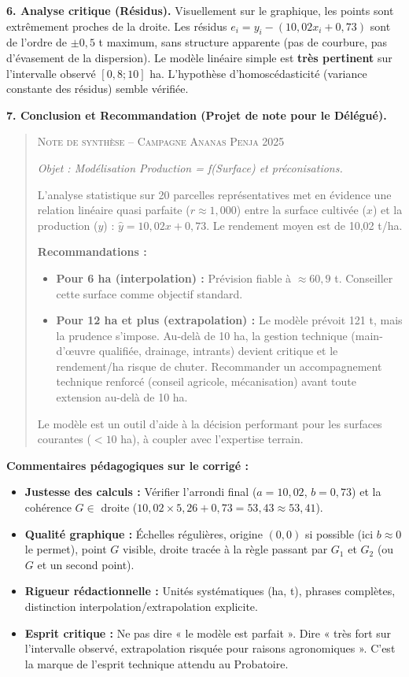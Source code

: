 \documentclass[11pt]{article}
\begin{document}
\begin{exoresolu}
\textbf{6. Analyse critique (Résidus).}
Visuellement sur le graphique, les points sont extrêmement proches de la droite. Les résidus $e_i = y_i - (10,02 x_i + 0,73)$ sont de l'ordre de $\pm 0,5$ t maximum, sans structure apparente (pas de courbure, pas d'évasement de la dispersion). Le modèle linéaire simple est \textbf{très pertinent} sur l'intervalle observé $[0,8; 10]$ ha. L'hypothèse d'homoscédasticité (variance constante des résidus) semble vérifiée.

\textbf{7. Conclusion et Recommandation (Projet de note pour le Délégué).}
\begin{quote}
\textsc{Note de synthèse -- Campagne Ananas Penja 2025}

\emph{Objet : Modélisation Production = f(Surface) et préconisations.}

L'analyse statistique sur 20 parcelles représentatives met en évidence une relation linéaire quasi parfaite ($r \approx 1,000$) entre la surface cultivée ($x$) et la production ($y$) : $\hat{y} = 10,02 x + 0,73$. Le rendement moyen est de 10,02 t/ha.

\textbf{Recommandations :}
\begin{itemize}
    \item \textbf{Pour 6 ha (interpolation) :} Prévision fiable à $\approx 60,9$ t. Conseiller cette surface comme objectif standard.
    \item \textbf{Pour 12 ha et plus (extrapolation) :} Le modèle prévoit 121 t, mais la prudence s'impose. Au-delà de 10 ha, la gestion technique (main-d'œuvre qualifiée, drainage, intrants) devient critique et le rendement/ha risque de chuter. Recommander un accompagnement technique renforcé (conseil agricole, mécanisation) avant toute extension au-delà de 10 ha.
\end{itemize}
Le modèle est un outil d'aide à la décision performant pour les surfaces courantes ($< 10$ ha), à coupler avec l'expertise terrain.
\end{quote}
\tcblower
\textbf{Commentaires pédagogiques sur le corrigé :}
\begin{itemize}
    \item \textbf{Justesse des calculs :} Vérifier l'arrondi final ($a=10,02$, $b=0,73$) et la cohérence $G \in$ droite ($10,02\times 5,26 + 0,73 = 53,43 \approx 53,41$).
    \item \textbf{Qualité graphique :} Échelles régulières, origine $(0,0)$ si possible (ici $b \approx 0$ le permet), point $G$ visible, droite tracée à la règle passant par $G_1$ et $G_2$ (ou $G$ et un second point).
    \item \textbf{Rigueur rédactionnelle :} Unités systématiques (ha, t), phrases complètes, distinction interpolation/extrapolation explicite.
    \item \textbf{Esprit critique :} Ne pas dire « le modèle est parfait ». Dire « très fort sur l'intervalle observé, extrapolation risquée pour raisons agronomiques ». C'est la marque de l'esprit technique attendu au Probatoire.
\end{itemize}
\end{exoresolu}
\end{document}
